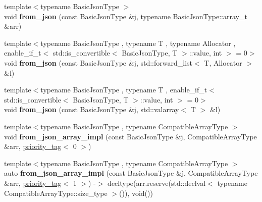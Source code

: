 \begin{DoxyCompactItemize}
\item 
{\footnotesize template$<$typename Basic\+Json\+Type $>$ }\\void {\bfseries from\+\_\+json} (const Basic\+Json\+Type \&j, typename Basic\+Json\+Type\+::array\+\_\+t \&arr)\hypertarget{namespacenlohmann_1_1detail_abc62958462b916726b89f25fa381a129}{}\label{namespacenlohmann_1_1detail_abc62958462b916726b89f25fa381a129}

\item 
{\footnotesize template$<$typename Basic\+Json\+Type , typename T , typename Allocator , enable\+\_\+if\+\_\+t$<$ std\+::is\+\_\+convertible$<$ Basic\+Json\+Type, T $>$\+::value, int $>$  = 0$>$ }\\void {\bfseries from\+\_\+json} (const Basic\+Json\+Type \&j, std\+::forward\+\_\+list$<$ T, Allocator $>$ \&l)\hypertarget{namespacenlohmann_1_1detail_a5cfb765aad92795abd7fda29d017272a}{}\label{namespacenlohmann_1_1detail_a5cfb765aad92795abd7fda29d017272a}

\item 
{\footnotesize template$<$typename Basic\+Json\+Type , typename T , enable\+\_\+if\+\_\+t$<$ std\+::is\+\_\+convertible$<$ Basic\+Json\+Type, T $>$\+::value, int $>$  = 0$>$ }\\void {\bfseries from\+\_\+json} (const Basic\+Json\+Type \&j, std\+::valarray$<$ T $>$ \&l)\hypertarget{namespacenlohmann_1_1detail_a3df497b1d3977f071b488ecac1401517}{}\label{namespacenlohmann_1_1detail_a3df497b1d3977f071b488ecac1401517}

\item 
{\footnotesize template$<$typename Basic\+Json\+Type , typename Compatible\+Array\+Type $>$ }\\void {\bfseries from\+\_\+json\+\_\+array\+\_\+impl} (const Basic\+Json\+Type \&j, Compatible\+Array\+Type \&arr, \hyperlink{structnlohmann_1_1detail_1_1priority__tag}{priority\+\_\+tag}$<$ 0 $>$)\hypertarget{namespacenlohmann_1_1detail_ac53673a5ce29fb69b96d41dad33cb3b0}{}\label{namespacenlohmann_1_1detail_ac53673a5ce29fb69b96d41dad33cb3b0}

\item 
{\footnotesize template$<$typename Basic\+Json\+Type , typename Compatible\+Array\+Type $>$ }\\auto {\bfseries from\+\_\+json\+\_\+array\+\_\+impl} (const Basic\+Json\+Type \&j, Compatible\+Array\+Type \&arr, \hyperlink{structnlohmann_1_1detail_1_1priority__tag}{priority\+\_\+tag}$<$ 1 $>$) -\/$>$ decltype(arr.\+reserve(std\+::declval$<$ typename Compatible\+Array\+Type\+::size\+\_\+type $>$()), void())\hypertarget{namespacenlohmann_1_1detail_a57f93ed57254a1639087cdc316e0fb83}{}\label{namespacenlohmann_1_1detail_a57f93ed57254a1639087cdc316e0fb83}


\end{DoxyCompactItemize}
